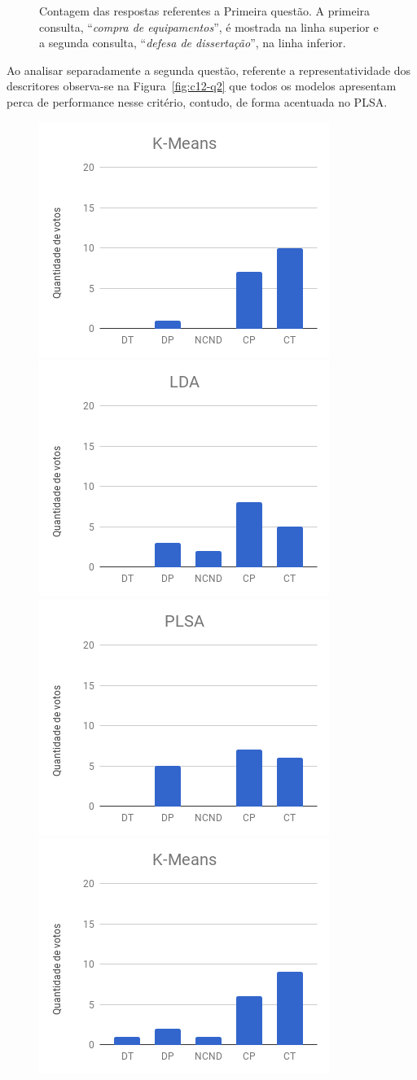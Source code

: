 \begin{figure}[!h]
	\caption{Contagem das respostas referentes a Primeira questão. A primeira consulta, ``\textit{compra de equipamentos}'', é mostrada na linha superior e a segunda consulta, ``\textit{defesa de dissertação}'', na linha inferior.}
	\label{fig:c12-q1}
\end{figure}



Ao analisar separadamente a segunda questão, referente a representatividade dos descritores observa-se na Figura~\ref{fig:c12-q2} que todos os modelos apresentam perca de performance nesse critério, contudo, de forma acentuada no PLSA. 



\begin{figure}[!h] \centering     %

		\includegraphics[width=.31\textwidth]{conteudo/capitulos/figs/figuras-experimento/C1-Q2-KMeans.png}
		\includegraphics[width=.31\textwidth]{conteudo/capitulos/figs/figuras-experimento/C1-Q2-LDA.png}
		\includegraphics[width=.31\textwidth]{conteudo/capitulos/figs/figuras-experimento/C1-Q2-PLSA.png}
		\includegraphics[width=.31\textwidth]{conteudo/capitulos/figs/figuras-experimento/C2-Q2-KMeans.png}

\end{figure}
